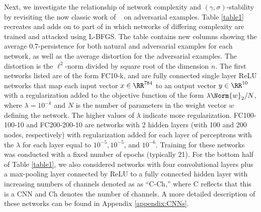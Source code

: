 Next, we investigate the relationship of network complexity and $(\gamma,\sigma)$-stability by revisiting the now classic work of ~\cite{Szegedy2013} on adversarial examples. 
%
Table \ref{table1} recreates and adds on to part of \cite[Table 1]{Szegedy2013} in which networks of differing complexity are trained and attacked using L-BFGS. The table contains new columns showing the average $0.7$-persistence for both natural and adversarial examples for each network, as well as the average distortion for the adversarial examples. The distortion is the $\ell^2$-norm divided by square root of the dimension $n$. The first networks listed are of the form FC10-k, and are fully connected single layer ReLU networks that map each input vector $x \in \RR^{784}$ to an output vector $y \in \RR^{10}$ with a regularization added to the objective function of the form $\lambda\Norm{w}_2/N$, where $\lambda = 10^{-k}$ and $N$ is the number of parameters in the weight vector $w$ defining the network. The higher values of $\lambda$ indicate more regularization.  
FC100-100-10 and FC200-200-10 are networks with 2 hidden layers (with 100 and 200 nodes, respectively) with regularization added for each layer of perceptrons with the $\lambda$ for each layer equal to $10^{-5}, 10^{-5}$, and  $10^{-6}$. Training for these networks was conducted with a fixed number of epochs (typically 21). For the bottom half of Table \ref{table1}, we also considered networks with four convolutional layers plus a max-pooling layer connected by ReLU to a fully connected hidden layer with increasing numbers of channels denoted as as ``C-Ch,'' where C reflects that this is a CNN and Ch denotes the number of channels. A more detailed description of these networks can be found in Appendix \ref{appendix:CNNs}.

